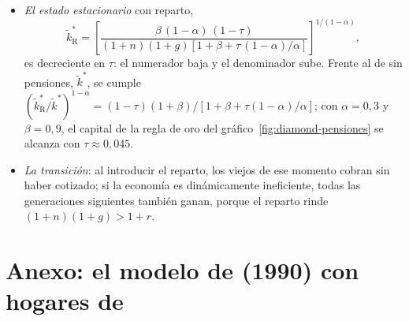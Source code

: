 \documentclass[11pt]{article}
\begin{document}
\begin{itemize}
\item \emph{El estado estacionario} con reparto,
  \begin{equation*}
  \tilde k^*_{\mathrm R}=\left[\frac{\beta\,(1-\alpha)\,(1-\tau)}{(1+n)(1+g)\left[1+\beta+\tau\,(1-\alpha)/\alpha\right]}\right]^{1/(1-\alpha)},
  \end{equation*}
  es decreciente en $\tau$: el numerador baja y el denominador sube. Frente al de sin pensiones, $\tilde k^*$, se cumple $(\tilde k^*_{\mathrm R}/\tilde k^*)^{1-\alpha}=(1-\tau)(1+\beta)/[1+\beta+\tau(1-\alpha)/\alpha]$; con $\alpha=0{,}3$ y $\beta=0{,}9$, el capital de la regla de oro del gráfico~\ref{fig:diamond-pensiones} se alcanza con $\tau\approx0{,}045$. \findemo
\item \emph{La transición}: al introducir el reparto, los viejos de ese momento cobran sin haber cotizado; si la economía es dinámicamente ineficiente, todas las generaciones siguientes también ganan, porque el reparto rinde $(1+n)(1+g)>1+r$.
\end{itemize}

\section{Anexo: el modelo de  (1990) con hogares de }\label{anexo:barro}
\end{document}
